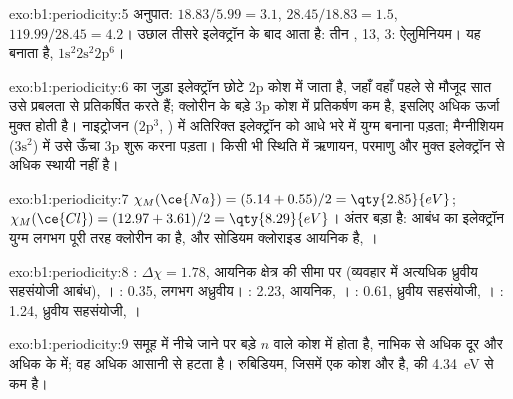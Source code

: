 \begin{solution}{exo:b1:periodicity:5}
अनुपात: $18.83/5.99 = 3.1$, $28.45/18.83 = 1.5$, $119.99/28.45 = 4.2$।
उछाल तीसरे इलेक्ट्रॉन के बाद आता है: तीन ,  13,
 3: ऐलुमिनियम। यह  बनाता है, $1\text{s}^2 2\text{s}^2
2\text{p}^6$।
\end{solution}

\begin{solution}{exo:b1:periodicity:6}
 का जुड़ा इलेक्ट्रॉन छोटे 2p कोश में जाता है, जहाँ वहाँ पहले से मौजूद
सात  उसे प्रबलता से प्रतिकर्षित करते हैं; क्लोरीन के
बड़े 3p कोश में प्रतिकर्षण कम है, इसलिए अधिक ऊर्जा
मुक्त होती है। नाइट्रोजन ($2\text{p}^3$, ) में अतिरिक्त इलेक्ट्रॉन
को आधे भरे  में युग्म बनाना पड़ता; मैग्नीशियम ($3\text{s}^2$) में
उसे ऊँचा 3p  शुरू करना पड़ता। किसी भी स्थिति में
ऋणायन, परमाणु और मुक्त इलेक्ट्रॉन से अधिक स्थायी नहीं है।
\end{solution}

\begin{solution}{exo:b1:periodicity:7}
$\chi_M(\ce{Na}) = (5.14 + 0.55)/2 = \qty{2.85}{eV}$; $\chi_M(\ce{Cl}) =
(12.97 + 3.61)/2 = \qty{8.29}{eV}$। अंतर बड़ा है:  आबंध का
इलेक्ट्रॉन युग्म लगभग पूरी तरह क्लोरीन का है, और सोडियम
क्लोराइड आयनिक है, ।
\end{solution}

\begin{solution}{exo:b1:periodicity:8}
: $\Delta\chi = 1.78$, आयनिक क्षेत्र की सीमा पर (व्यवहार में
अत्यधिक ध्रुवीय सहसंयोजी आबंध), । : 0.35,
लगभग अध्रुवीय। : 2.23, आयनिक, । : 0.61,
ध्रुवीय सहसंयोजी, । : 1.24, ध्रुवीय
सहसंयोजी, ।
\end{solution}

\begin{solution}{exo:b1:periodicity:9}
समूह में नीचे जाने पर  बड़े $n$ वाले कोश में होता है, नाभिक से
अधिक दूर और अधिक  के  में; वह अधिक
आसानी से हटता है। रुबिडियम, जिसमें एक कोश और है, की 
\qty{4.34}{eV} से कम है।
\end{solution}

